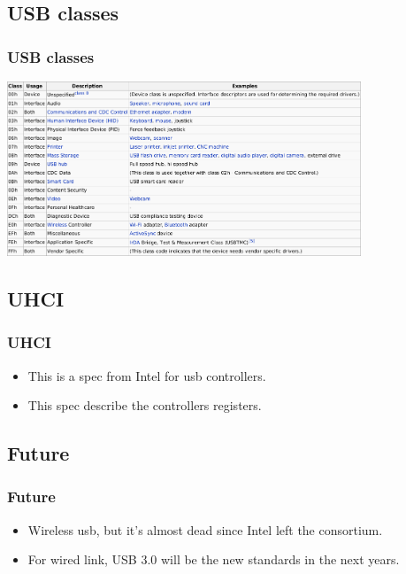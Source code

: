 \subsection{USB classes}
\begin{frame}
\frametitle{USB classes}
\begin{center}
\includegraphics[width=300pt]{figures/usb_classes}
\end{center}
\end{frame}

\subsection{UHCI}
\begin{frame}
\frametitle{UHCI}
\begin{itemize}
\item This is a spec from Intel for usb controllers.
\item This spec describe the controllers registers.
\end{itemize}
\end{frame}

\subsection{Future}
\begin{frame}
\frametitle{Future}
\begin{itemize}
\item Wireless usb, but it's almost dead since Intel left the consortium.
\item For wired link, USB 3.0 will be the new standards in the next years.
\end{itemize}
\end{frame}





